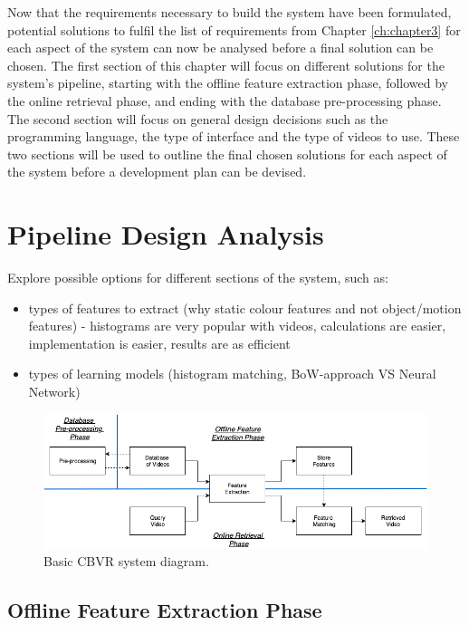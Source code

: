Now that the requirements necessary to build the system have been formulated, potential solutions to fulfil the list of requirements from Chapter \ref{ch:chapter3} for each aspect of the system can now be analysed before a final solution can be chosen. The first section of this chapter will focus on different solutions for the system's pipeline, starting with the offline feature extraction phase, followed by the online retrieval phase, and ending with the database pre-processing phase. The second section will focus on general design decisions such as the programming language, the type of interface and the type of videos to use. These two sections will be used to outline the final chosen solutions for each aspect of the system before a development plan can be devised.

\section{Pipeline Design Analysis}

Explore possible options for different sections of the system, such as:
    \begin{itemize}
        \item types of features to extract (why static colour features and not object/motion features) - histograms are very popular with videos, calculations are easier, implementation is easier, results are as efficient
        \item types of learning models (histogram matching, BoW-approach VS Neural Network)
    \end{itemize}
    
\begin{figure}[h]
\centerline{\includegraphics[width=1.15\textwidth]{figures/design/basic_cbvr_phases.png}}
\caption{\label{fig:basic-cbvr-diagram}Basic CBVR system diagram.}
\end{figure}

\subsection{Offline Feature Extraction Phase}

